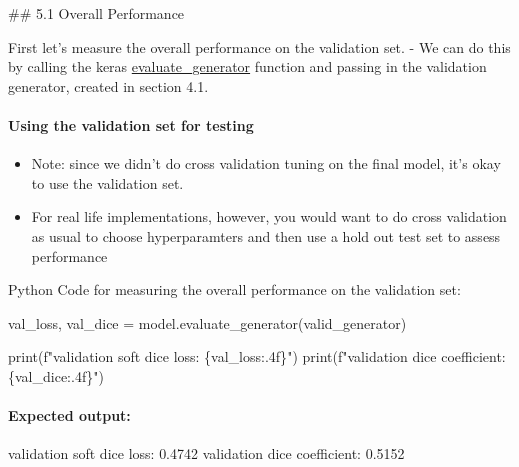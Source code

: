 \documentclass[11pt]{article}
\providecommand{\tightlist}{%
      \setlength{\itemsep}{0pt}\setlength{\parskip}{0pt}}
\newenvironment{Shaded}{}{}
\newcommand{\FloatTok}[1]{\textcolor[rgb]{0.25,0.63,0.44}{{#1}}}
\newcommand{\NormalTok}[1]{{#1}}
\newcommand{\SpecialCharTok}[1]{\textcolor[rgb]{0.25,0.44,0.63}{{#1}}}
\newcommand{\SpecialStringTok}[1]{\textcolor[rgb]{0.73,0.40,0.53}{{#1}}}
\newcommand{\OperatorTok}[1]{\textcolor[rgb]{0.40,0.40,0.40}{{#1}}}
\newcommand{\BuiltInTok}[1]{{#1}}
\begin{document}
     \#\# 5.1 Overall Performance

    First let's measure the overall performance on the validation set. - We
can do this by calling the keras
\href{https://keras.io/models/model/\#evaluate_generator}{evaluate\_generator}
function and passing in the validation generator, created in section
4.1.

\hypertarget{using-the-validation-set-for-testing}{%
\paragraph{Using the validation set for
testing}\label{using-the-validation-set-for-testing}}

\begin{itemize}
\tightlist
\item
  Note: since we didn't do cross validation tuning on the final model,
  it's okay to use the validation set.
\item
  For real life implementations, however, you would want to do cross
  validation as usual to choose hyperparamters and then use a hold out
  test set to assess performance
\end{itemize}

Python Code for measuring the overall performance on the validation set:

\begin{Shaded}
\begin{Highlighting}[]
\NormalTok{val_loss, val_dice }\OperatorTok{=}\NormalTok{ model.evaluate_generator(valid_generator)}

\BuiltInTok{print}\NormalTok{(}\SpecialStringTok{f"validation soft dice loss: }\SpecialCharTok{\{}\NormalTok{val_loss}\SpecialCharTok{:.4f\}}\SpecialStringTok{"}\NormalTok{)}
\BuiltInTok{print}\NormalTok{(}\SpecialStringTok{f"validation dice coefficient: }\SpecialCharTok{\{}\NormalTok{val_dice}\SpecialCharTok{:.4f\}}\SpecialStringTok{"}\NormalTok{)}
\end{Highlighting}
\end{Shaded}

\hypertarget{expected-output}{%
\paragraph{Expected output:}\label{expected-output}}

\begin{Shaded}
\begin{Highlighting}[]
\NormalTok{validation soft dice loss: }\FloatTok{0.4742}
\NormalTok{validation dice coefficient: }\FloatTok{0.5152}
\end{Highlighting}
\end{Shaded}
\end{document}
